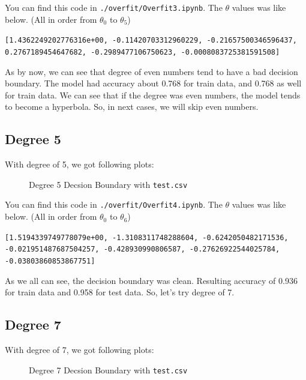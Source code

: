 \documentclass{homework}
\begin{document}
You can find this code in \texttt{./overfit/Overfit3.ipynb}. The $\theta$ values was like below. (All in order from $\theta_0$ to $\theta_5$)

\begin{center}
\texttt{[1.4362249202776316e+00, -0.11420703312960229, -0.21657500346596437, 0.2767189454647682, -0.2989477106750623, -0.0008083725381591508]}
\end{center}

As by now, we can see that degree of even numbers tend to have a bad decision boundary. The model had accuracy about 0.768 for train data, and 0.768 as well for train data. We can see that if the degree was even numbers, the model tends to become a hyperbola. So, in next cases, we will skip even numbers.

\subsection{Degree 5}
With degree of 5, we got following plots:

\begin{figure}[h]
    \begin{center}
        \resizebox{0.5\textwidth}{!}{}
    \end{center}
    \caption{Degree 5 Decsion Boundary with \texttt{test.csv}}
\end{figure}

You can find this code in \texttt{./overfit/Overfit4.ipynb}. The $\theta$ values was like below. (All in order from $\theta_0$ to $\theta_6$)

\begin{center}
\texttt{[1.5194339749778079e+00, -1.3108311748288604, -0.6242050482171536, -0.021951487687504257, -0.428930990806587, -0.27626922544025784, -0.03803860853867751]}
\end{center}

As we all can see, the decision boundary was clean. Resulting accuracy of 0.936 for train data and 0.958 for test data. So, let's try degree of 7.

\subsection{Degree 7}
With degree of 7, we got following plots:

\begin{figure}[h]
    \begin{center}
        \resizebox{0.5\textwidth}{!}{}
    \end{center}
    \caption{Degree 7 Decsion Boundary with \texttt{test.csv}}
\end{figure}
\end{document}
